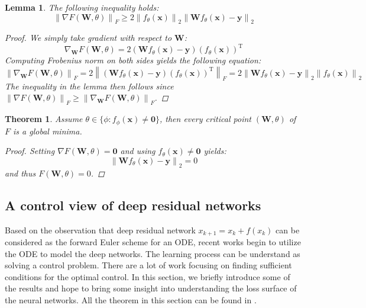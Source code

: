 \documentclass{article}
\theoremstyle{plain}
\newtheorem{thm}{Theorem}
\newtheorem{lem}{Lemma}
\theoremstyle{definition}
\newcommand{\norm}[1]{\left\lVert#1\right\rVert}
\begin{document}
\begin{lem}
The following inequality holds:
$$
\norm{\nabla F(\mathbf{W},\theta)}_F\geq 2\norm{f_{\theta}(\mathbf{x})}_2\norm{\mathbf{W}f_{\theta}(\mathbf{x})-\mathbf{y}}_2
$$

\begin{proof}
We simply take gradient with respect to $\mathbf{W}$:
$$
\nabla_{\mathbf{W}}F(\mathbf{W},\theta)=2(\mathbf{W}f_{\theta}(\mathbf{x})-\mathbf{y})\left(f_{\theta}(\mathbf{x})\right)^{\mathrm{T}}
$$
Computing Frobenius norm on both sides yields the following equation:
$$
\norm{\nabla_{\mathbf{W}}F(\mathbf{W},\theta)}_F=2\norm{(\mathbf{W}f_{\theta}(\mathbf{x})-\mathbf{y})\left(f_{\theta}(\mathbf{x})\right)^{\mathrm{T}}}_F=2\norm{\mathbf{W}f_{\theta}(\mathbf{x})-\mathbf{y}}_2\norm{f_{\theta}(\mathbf{x})}_2
$$
The inequality in the lemma then follows since $\norm{\nabla F(\mathbf{W},\theta)}_F\geq\norm{\nabla_{\mathbf{W}}F(\mathbf{W},\theta)}_F$.
\end{proof}
\end{lem}

\begin{thm}
Assume $\theta\in\{\phi:f_{\phi}(\mathbf{x})\neq\mathbf{0}\}$, then every critical point $(\mathbf{W},\theta)$ of $F$ is a global minima.

\begin{proof}
Setting $\nabla F(\mathbf{W},\theta)=\mathbf{0}$ and using $f_{\theta}(\mathbf{x})\neq\mathbf{0}$ yields:
$$
\norm{\mathbf{W}f_{\theta}(\mathbf{x})-\mathbf{y}}_2=0
$$
and thus $F(\mathbf{W},\theta)=0$.
\end{proof}
\end{thm}

\subsection{A control view of deep residual networks}

Based on the observation that deep residual network $x_{k+1}=x_{k}+f(x_k)$ can be considered as the forward Euler scheme for an ODE, recent works begin to utilize the ODE to model the deep networks. The learning process can be understand as solving a control problem. There are a lot of work focusing on finding sufficient conditions for the optimal control. In this section, we briefly introduce some of the results and hope to bring some insight into understanding the loss surface of the neural networks. All the theorem in this section can be found in \cite{bressan2007introduction}.
\end{document}
